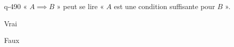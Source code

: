 \begin{truefalse}{q-490}
« $A \implies B$ » peut se lire « $A$ est une condition suffisante pour $B$ ».
\item* Vrai
\item Faux
\end{truefalse}

